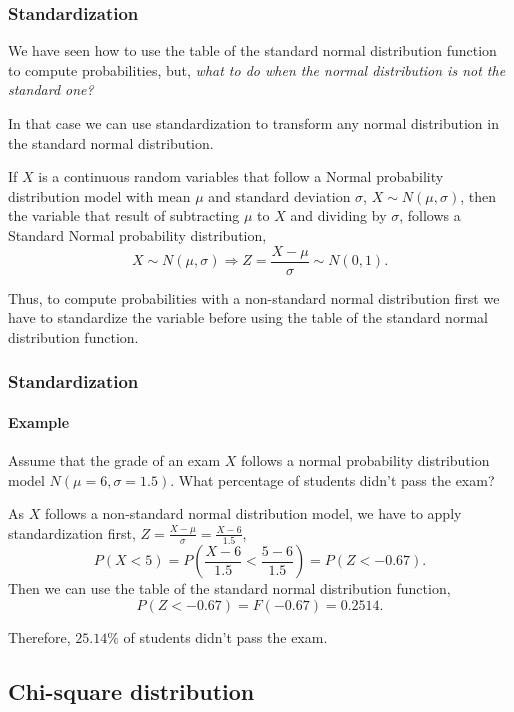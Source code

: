 \begin{frame}
\frametitle{Standardization}
We have seen how to use the table of the standard normal distribution function to compute probabilities, but, \emph{what
to do when the normal distribution is not the standard one?}

In that case we can use standardization to transform any normal distribution in the standard normal distribution.
\begin{theorem}[Standardization]
If $X$ is a continuous random variables that follow a Normal probability distribution model with mean $\mu$ and standard
deviation $\sigma$, $X\sim N(\mu,\sigma)$, then the variable that result of subtracting $\mu$ to $X$ and dividing by
$\sigma$, follows a Standard Normal probability distribution,
\[
X\sim N(\mu,\sigma) \Rightarrow Z=\frac{X-\mu}{\sigma}\sim N(0,1).
\]
\end{theorem}

Thus, to compute probabilities with a non-standard normal distribution first we have to standardize the variable before 
using the table of the standard normal distribution function.
\end{frame}


\begin{frame}
\frametitle{Standardization}
\framesubtitle{Example}
Assume that the grade of an exam $X$ follows a normal probability distribution model $N(\mu=6,\sigma=1.5)$. 
What percentage of students didn't pass the exam?

As $X$ follows a non-standard normal distribution model, we have to apply standardization first, $Z=\displaystyle
\frac{X-\mu}{\sigma} = \frac{X-6}{1.5}$,
\[
P(X<5) = P\left(\frac{X-6}{1.5}<\frac{5-6}{1.5}\right) = P(Z<-0.67).
\]
Then we can use the table of the standard normal distribution function,
\[
P(Z<-0.67) = F(-0.67) = 0.2514.
\]

Therefore, $25.14\%$ of students didn't pass the exam.
\end{frame}


\subsection{Chi-square distribution}

